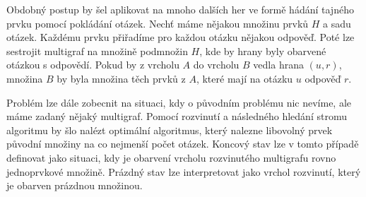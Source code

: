 Obdobný postup by šel aplikovat na mnoho dalších her ve formě hádání tajného prvku pomocí pokládání otázek. Nechť máme nějakou množinu prvků $H$ a sadu otázek. Každému prvku přiřadíme pro každou otázku nějakou odpověď. Poté lze sestrojit multigraf na množině podmnožin $H$, kde by hrany byly obarvené otázkou s odpovědí. Pokud by z vrcholu $A$ do vrcholu $B$ vedla hrana $(u,r)$, množina $B$ by byla množina těch prvků z $A$, které mají na otázku $u$ odpověď $r$. 

Problém lze dále zobecnit na situaci, kdy o původním problému nic nevíme, ale máme zadaný nějaký multigraf. Pomocí rozvinutí a následného hledání stromu algoritmu by šlo nalézt optimální algoritmus, který nalezne libovolný prvek původní množiny na co nejmenší počet otázek. Koncový stav lze v tomto případě definovat jako situaci, kdy je obarvení vrcholu rozvinutého multigrafu rovno jednoprvkové množině. Prázdný stav lze interpretovat jako vrchol rozvinutí, který je obarven prázdnou množinou. 








